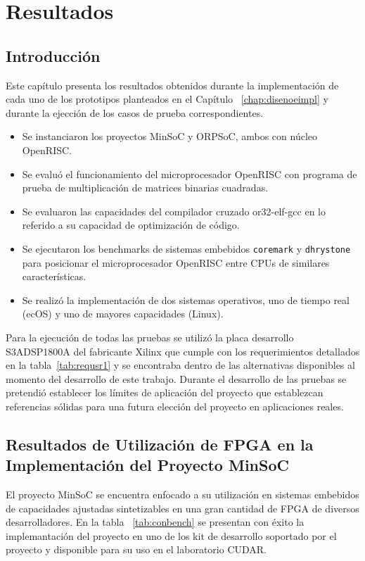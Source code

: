 \chapter{Resultados} \label {chap:resultados}
	\section{Introducción} 
	
	Este capítulo presenta los resultados obtenidos durante la implementación de cada uno de los prototipos planteados en el Capítulo
	~\ref{chap:disenoeimpl} y durante la ejección de los casos de prueba correspondientes. 
\begin{itemize}
\item Se instanciaron los proyectos MinSoC y ORPSoC, ambos con núcleo OpenRISC. 
\item Se evaluó el funcionamiento del microprocesador OpenRISC con programa de prueba de multiplicación de matrices binarias cuadradas.
\item Se evaluaron las capacidades del compilador cruzado or32-elf-gcc en lo referido a su capacidad de optimización de código. 
\item Se ejecutaron los benchmarks de sistemas embebidos \verb|coremark| y \verb|dhrystone| para posicionar el microprocesador OpenRISC entre CPUs de similares
características.
\item Se realizó la implementación de dos sistemas operativos, uno de tiempo real (ecOS) y uno de mayores capacidades (Linux). 
\end{itemize}				
				
	Para la ejecución de todas las pruebas se utilizó la placa desarrollo S3ADSP1800A del fabricante Xilinx que cumple con los requerimientos detallados
	en la tabla~\ref{tab:requsr1} y se encontraba dentro de las alternativas disponibles al momento del desarrollo de este trabajo. Durante el desarrollo de las pruebas se pretendió establecer los límites de aplicación del proyecto
	que establezcan referencias sólidas para una futura elección del proyecto en aplicaciones reales.


	\newpage
	\section{Resultados de Utilización de FPGA en la Implementación del Proyecto MinSoC}

El proyecto MinSoC se encuentra enfocado a su utilización en sistemas embebidos de capacidades ajustadas sintetizables en una gran cantidad de FPGA de diversos desarrolladores. En la tabla ~\ref{tab:conbench} se presentan con éxito la implemantación del proyecto en uno de los kit de desarrollo soportado por el proyecto y disponible para su uso en el laboratorio CUDAR.

